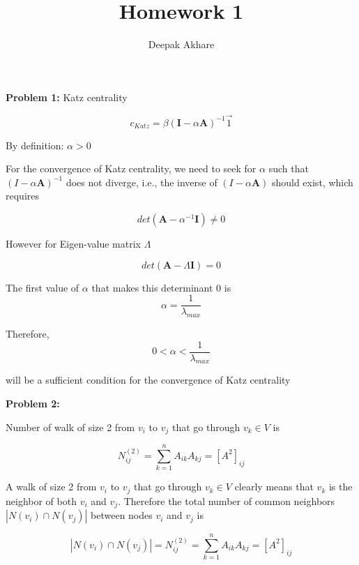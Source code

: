 \documentclass[11pt]{article}
\title{Homework 1}
\author{Deepak Akhare}
\begin{document}
\maketitle

\textbf{Problem 1:}
Katz centrality

\begin{equation}
    c_{Katz} = \beta (\textbf{I} - \alpha \textbf{A})^{-1} \Vec{1}
\end{equation}

By definition: $\alpha > 0$

For the convergence of Katz centrality, we need to seek for $\alpha$ such that $(I - \alpha \textbf{A})^{-1}$ does not diverge, i.e., the inverse of $(I - \alpha \textbf{A})$ should exist, which requires

\[ det(\textbf{A}-\alpha^{-1}\textbf{I}) \neq 0 \]

However for Eigen-value matrix $\Lambda$

\[ det(\textbf{A}-\Lambda\textbf{I}) = 0 \]

The first value of $\alpha$ that makes this determinant 0 is
\[ \alpha = \frac{1}{\lambda_{max}} \]

Therefore, 
\begin{equation}
     0 < \alpha < \frac{1}{\lambda_{max}}
\end{equation}

will be a sufficient condition for the convergence of Katz centrality

\clearpage


\textbf{Problem 2:}

Number of walk of size 2 from $v_i$ to $v_j$ that go through $v_k\in V$ is

\begin{equation}
    N^{(2)}_{ij} = \sum_{k=1}^n A_{ik}A_{kj} = [A^2]_{ij}
\end{equation}

A walk of size 2 from $v_i$ to $v_j$ that go through $v_k\in V$ clearly means that $v_k$ is the neighbor of both $v_i$ and $v_j$. Therefore the total number of common neighbors $|N(v_i) \cap N(v_j)|$ between nodes $v_i$ and $v_j$ is 

\begin{equation}
    |N(v_i) \cap N(v_j)| = N^{(2)}_{ij} = \sum_{k=1}^n A_{ik}A_{kj} = [A^2]_{ij}
\end{equation}


\end{document}
